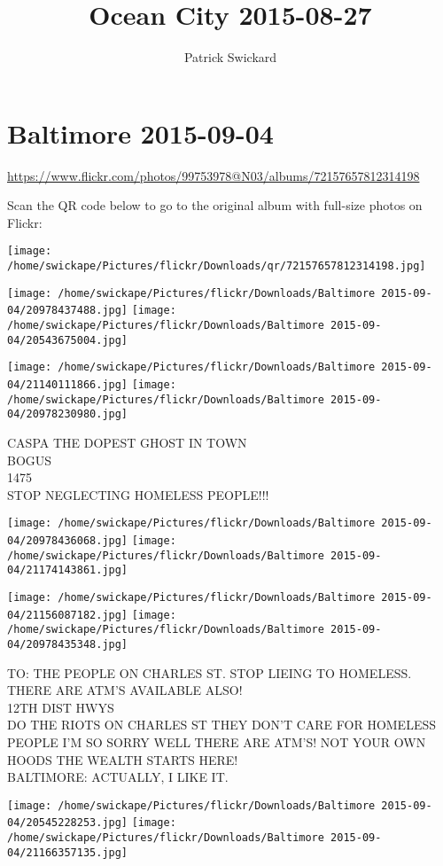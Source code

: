 \documentclass[10pt,letterpaper]{article}
\title{Ocean City 2015-08-27}
\author{Patrick Swickard}
\date{}
\begin{document}
\section*{Baltimore 2015-09-04}

\url{https://www.flickr.com/photos/99753978@N03/albums/72157657812314198}

Scan the QR code below to go to the original album with full-size photos on Flickr:

\texttt{[image: /home/swickape/Pictures/flickr/Downloads/qr/72157657812314198.jpg]}
\pagebreak

\texttt{[image: /home/swickape/Pictures/flickr/Downloads/Baltimore 2015-09-04/20978437488.jpg]}
\texttt{[image: /home/swickape/Pictures/flickr/Downloads/Baltimore 2015-09-04/20543675004.jpg]}

\texttt{[image: /home/swickape/Pictures/flickr/Downloads/Baltimore 2015-09-04/21140111866.jpg]}
\texttt{[image: /home/swickape/Pictures/flickr/Downloads/Baltimore 2015-09-04/20978230980.jpg]}

CASPA THE DOPEST GHOST IN TOWN\\
BOGUS\\
1475\\
STOP NEGLECTING HOMELESS PEOPLE!!!
\pagebreak

\texttt{[image: /home/swickape/Pictures/flickr/Downloads/Baltimore 2015-09-04/20978436068.jpg]}
\texttt{[image: /home/swickape/Pictures/flickr/Downloads/Baltimore 2015-09-04/21174143861.jpg]}

\texttt{[image: /home/swickape/Pictures/flickr/Downloads/Baltimore 2015-09-04/21156087182.jpg]}
\texttt{[image: /home/swickape/Pictures/flickr/Downloads/Baltimore 2015-09-04/20978435348.jpg]}

TO: THE PEOPLE ON CHARLES ST. STOP LIEING TO HOMELESS.  THERE ARE ATM'S AVAILABLE ALSO!\\
12TH DIST HWYS\\
DO THE RIOTS ON CHARLES ST THEY DON'T CARE FOR HOMELESS PEOPLE I'M SO SORRY WELL THERE ARE ATM'S!  NOT YOUR OWN HOODS THE WEALTH STARTS HERE!\\
BALTIMORE: ACTUALLY, I LIKE IT.
\pagebreak

\texttt{[image: /home/swickape/Pictures/flickr/Downloads/Baltimore 2015-09-04/20545228253.jpg]}
\texttt{[image: /home/swickape/Pictures/flickr/Downloads/Baltimore 2015-09-04/21166357135.jpg]}
\end{document}

